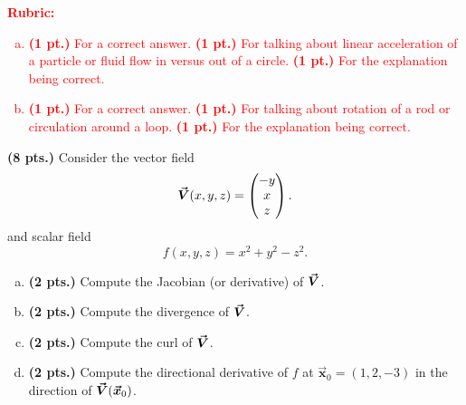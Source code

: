\documentclass[12pt]{article} %
\newcommand{\vecx}{\boldsymbol{\vec{x}}}
\begin{document}
\vspace*{1cm}
\textcolor{red}{
\noindent \textbf{Rubric:}
\begin{enumerate}[(a)]
    \item \textbf{(1 pt.)} For a correct answer. \textbf{(1 pt.)} For talking about linear acceleration of a particle or fluid flow in versus out of a circle. \textbf{(1 pt.)} For the explanation being correct.
	\item \textbf{(1 pt.)} For a correct answer. \textbf{(1 pt.)} For talking about rotation of a rod or circulation around a loop. \textbf{(1 pt.)} For the explanation being correct.
\end{enumerate}
}
\newpage

\begin{problem}
\textbf{(8 pts.)} Consider the vector field
\[
\boldsymbol{\vec{V}}(x,y,z) = \begin{pmatrix} -y \\ x \\ z \end{pmatrix}.
\]
and scalar field
\[
f(x,y,z) = x^2+y^2-z^2.
\]
\begin{enumerate}[(a)]
    \item \textbf{(2 pts.)} Compute the Jacobian (or derivative) of $\boldsymbol{\vec{V}}$.
    \item \textbf{(2 pts.)} Compute the divergence of $\boldsymbol{\vec{V}}$.
    \item \textbf{(2 pts.)} Compute the curl of $\boldsymbol{\vec{V}}$.
    \item \textbf{(2 pts.)} Compute the directional derivative of $f$ at $\vecx_0 = (1,2,-3)$ in the direction of $\vecfieldV(\vecx_0)$.
\end{enumerate}
\end{problem}
\end{document}
